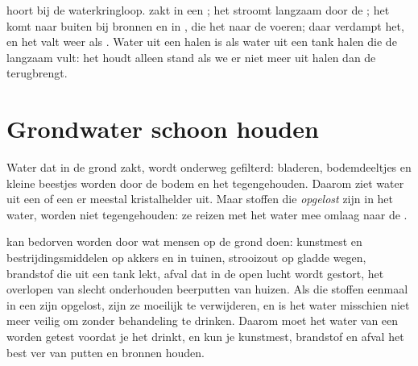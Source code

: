  hoort bij de waterkringloop.  zakt in een ; het  stroomt langzaam door de ; het komt naar buiten bij bronnen en in , die het naar de  voeren; daar
verdampt het, en het valt weer als . Water uit een 
halen is als water uit een tank halen die de  langzaam vult: het
houdt alleen stand als we er niet meer uit halen dan de  terugbrengt.

\section{Grondwater schoon houden}

Water dat in de grond zakt, wordt onderweg gefilterd: bladeren,
bodemdeeltjes en kleine beestjes worden door de bodem en het 
tegengehouden. Daarom ziet water uit een  of een  er meestal
kristalhelder uit. Maar stoffen die \emph{opgelost} zijn in het water,
worden niet tegengehouden: ze reizen met het water mee omlaag naar de
.

 kan bedorven worden door wat mensen op de grond doen: kunstmest
en bestrijdingsmiddelen op akkers en in tuinen, strooizout op gladde
wegen, brandstof die uit een tank lekt, afval dat in de open lucht wordt
gestort, het overlopen van slecht onderhouden beerputten van huizen. Als
die stoffen eenmaal in een  zijn opgelost, zijn ze
moeilijk te verwijderen, en is het water misschien niet meer veilig om
zonder behandeling te drinken. Daarom moet het water van een  worden getest voordat je het drinkt, en kun je kunstmest, brandstof en afval het best ver van putten en bronnen houden.

